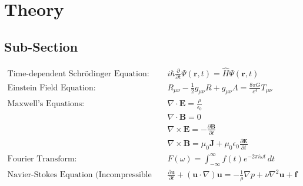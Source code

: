 \section{Theory}
\vspace{-3em}
\subsection{Sub-Section}
\vspace{-2em}
\hspace{\parindent}
\begin{align*}
\text{Time-dependent Schrödinger Equation:} \quad & i\hbar\frac{\partial}{\partial t}\Psi(\mathbf{r},t) = \hat{H}\Psi(\mathbf{r},t) \\
\text{Einstein Field Equation:} \quad & R_{\mu \nu} - \frac{1}{2}g_{\mu \nu}R + g_{\mu \nu}\Lambda = \frac{8\pi G}{c^4}T_{\mu \nu} \\
\text{Maxwell's Equations:} \quad & \nabla \cdot \mathbf{E} = \frac{\rho}{\epsilon_0} \\
& \nabla \cdot \mathbf{B} = 0 \\
& \nabla \times \mathbf{E} = -\frac{\partial \mathbf{B}}{\partial t} \\
& \nabla \times \mathbf{B} = \mu_0\mathbf{J} + \mu_0\epsilon_0\frac{\partial \mathbf{E}}{\partial t} \\
\text{Fourier Transform:} \quad & F(\omega) = \int_{-\infty}^{\infty} f(t) e^{-2\pi i \omega t} \, dt \\
\text{Navier-Stokes Equation (Incompressible Flow):} \quad & \frac{\partial \mathbf{u}}{\partial t} + (\mathbf{u} \cdot \nabla)\mathbf{u} = -\frac{1}{\rho}\nabla p + \nu \nabla^2 \mathbf{u} + \mathbf{f} \\
\end{align*}
